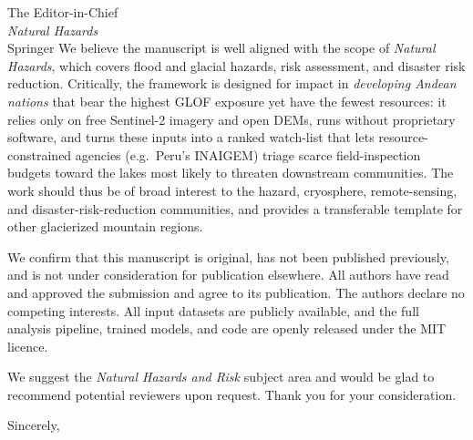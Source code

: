 \documentclass[11pt]{letter}
\begin{document}
\begin{letter}{The Editor-in-Chief\\ \textit{Natural Hazards}\\ Springer}
We believe the manuscript is well aligned with the scope of
\textit{Natural Hazards}, which covers flood and glacial hazards,
risk assessment, and disaster risk reduction. Critically, the framework
is designed for impact in \emph{developing Andean nations} that bear the
highest GLOF exposure yet have the fewest resources: it relies only on
free Sentinel-2 imagery and open DEMs, runs without proprietary
software, and turns these inputs into a ranked watch-list that lets
resource-constrained agencies (e.g.\ Peru's INAIGEM) triage scarce
field-inspection budgets toward the lakes most likely to threaten
downstream communities. The work should thus be of broad interest to the
hazard, cryosphere, remote-sensing, and disaster-risk-reduction
communities, and provides a transferable template for other glacierized
mountain regions.

We confirm that this manuscript is original, has not been published
previously, and is not under consideration for publication elsewhere.
All authors have read and approved the submission and agree to its
publication. The authors declare no competing interests. All input
datasets are publicly available, and the full analysis pipeline,
trained models, and code are openly released under the MIT licence.

We suggest the \emph{Natural Hazards and Risk} subject area and would be
glad to recommend potential reviewers upon request. Thank you for your
consideration.

\closing{Sincerely,}

\end{letter}
\end{document}
